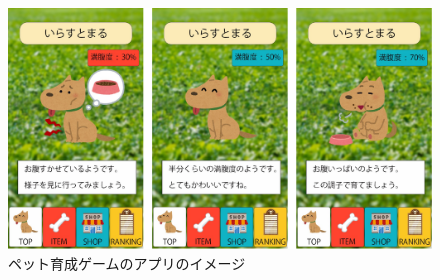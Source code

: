 \begin{figure}[H]
  \begin{center}
    \includegraphics[width=160mm]{image/petimage.pdf}
    \caption{ペット育成ゲームのアプリのイメージ}
    \label{petimage}
  \end{center}
\end{figure}

\thispagestyle{myheadings}